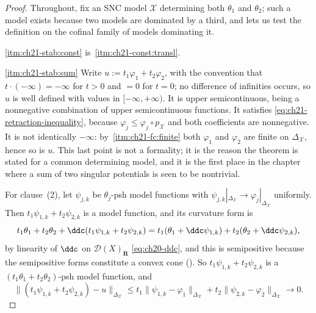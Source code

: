 \begin{proof}
Throughout, fix an SNC model $\mathcal X$ determining both
$\theta_1$ and $\theta_2$; such a model exists because two models are
dominated by a third, and  lets us test
the definition on the cofinal family of models dominating it.

\cref{itm:ch21-stab:const} is
\,\cref{itm:ch21-const:transl}.

\cref{itm:ch21-stab:sum}  Write $u:=t_1\varphi_1+t_2\varphi_2$, with the
convention that $t\cdot(-\infty)=-\infty$ for $t>0$ and $=0$ for
$t=0$; no difference of infinities occurs, so $u$ is well defined with
values in $[-\infty,+\infty)$.  It is upper semicontinuous, being a
nonnegative combination of upper semicontinuous functions.  It satisfies
\eqref{eq:ch21-retraction-inequality}, because
$\varphi_j\leq\varphi_j\circ p_{\mathcal X}$ and both coefficients are
nonnegative.  It is not identically $-\infty$: by
\,\cref{itm:ch21-fc:finite} both
$\varphi_1$ and $\varphi_2$ are finite on $\Delta_{\mathcal X}$,
hence so is $u$.  This last point is not a formality; it is the
reason the theorem is stated for a common determining model, and it is the
first place in the chapter where a sum of two singular potentials is seen
to be nontrivial.

For clause~(2), let $\psi_{j,k}$ be $\theta_j$-psh model functions with
$\psi_{j,k}|_{\Delta_{\mathcal X}}\to\varphi_j|_{\Delta_{\mathcal X}}$
uniformly.  Then $t_1\psi_{1,k}+t_2\psi_{2,k}$ is a model function, and
its curvature form is
\[
 t_1\theta_1+t_2\theta_2
 +\ddc(t_1\psi_{1,k}+t_2\psi_{2,k})
 =t_1(\theta_1+\ddc\psi_{1,k})+t_2(\theta_2+\ddc\psi_{2,k}),
\]
by linearity of $\ddc$ on $\mathcal D(X)_{\mathbf R}$
\eqref{eq:ch20-ddc}, and this is semipositive because the semipositive
forms constitute a convex cone
().  So
$t_1\psi_{1,k}+t_2\psi_{2,k}$ is a
$(t_1\theta_1+t_2\theta_2)$-psh model function, and
\[
 \bigl\lVert (t_1\psi_{1,k}+t_2\psi_{2,k})-u\bigr\rVert_{\Delta_{\mathcal X}}
 \leq t_1\lVert\psi_{1,k}-\varphi_1\rVert_{\Delta_{\mathcal X}}
     +t_2\lVert\psi_{2,k}-\varphi_2\rVert_{\Delta_{\mathcal X}}
 \longrightarrow0 .
\]


\end{proof}
